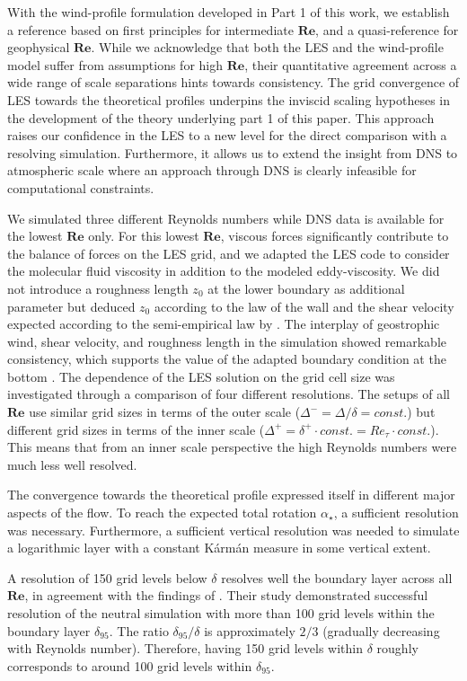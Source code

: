 \documentclass[smallcondensed,final]{svjour3}
\newcommand{\RE}{\mathbf{Re}}
\begin{document}
With the wind-profile formulation developed in Part 1 of this work, we establish a reference based on first principles for intermediate $\RE$, and a quasi-reference for geophysical $\RE$. While we acknowledge that both the LES and the wind-profile model suffer from assumptions for high $\RE$, their quantitative agreement across a wide range of scale separations hints towards consistency. The grid convergence of LES towards the theoretical profiles underpins the inviscid scaling hypotheses in the development of the theory underlying part 1 of this paper. This approach raises our confidence in the LES to a new level for the direct comparison with a resolving simulation. Furthermore, it allows us to extend the insight from DNS to atmospheric scale where an approach through DNS is clearly infeasible for computational constraints. 


We simulated three different Reynolds numbers while DNS data is available for the lowest $\RE$ only. For this lowest $\RE$, viscous forces significantly contribute to the balance of forces on the LES grid, and we adapted the LES code to consider the molecular fluid viscosity in addition to the modeled eddy-viscosity. We did not introduce a roughness length $z_0$ at the lower boundary as additional parameter but deduced $z_0$ according to the law of the wall and the shear velocity expected according to the semi-empirical law by \cite{spalart1989theoretical}. The interplay of geostrophic wind, shear velocity, and roughness length in the simulation showed remarkable consistency, which supports the value of the adapted boundary condition at the bottom \citep{maronga2017formulation}. The dependence of the LES solution on the grid cell size was investigated through a comparison of four different resolutions. The setups of all $\RE$ use similar grid sizes in terms of the outer scale ($\Delta^-=\Delta/\delta=const.$) but different grid sizes in terms of the inner scale ($\Delta^+=\delta^+\cdot const. = Re_\tau\cdot const.$). This means that from an inner scale perspective the high Reynolds numbers were much less well resolved.

The convergence towards the theoretical profile expressed itself in different major aspects of the flow. To reach the expected total rotation $\alpha_\star$, a sufficient resolution was necessary. Furthermore, a sufficient vertical resolution was needed to simulate a logarithmic layer with a constant K\'arm\'an measure in some vertical extent.

A resolution of 150 grid levels below $\delta$ resolves well the boundary layer across all $\RE$, in agreement with the findings of \cite{wurps2020grid}. Their study demonstrated successful resolution of the neutral simulation with more than 100 grid levels within the boundary layer $\delta_{95}$. The ratio $\delta_{95}/\delta$ is approximately $2/3$ (gradually decreasing with Reynolds number). Therefore, having 150 grid levels within $\delta$ roughly corresponds to around 100 grid levels within $\delta_{95}$.
\end{document}
